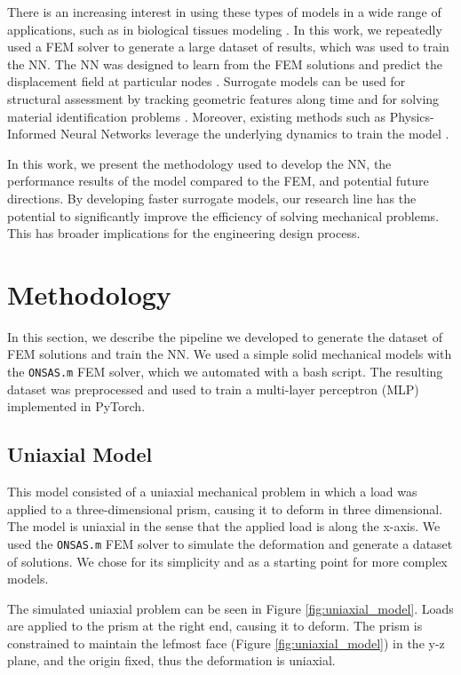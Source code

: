 \documentclass[oneside,a4paper,english,links]{amca}
\begin{document}
There is an increasing interest in using these types of models in a wide range of applications, such as in biological tissues modeling \citep{pellicer2020real}. In this work, we repeatedly used a FEM solver to generate a large dataset of results, which was used to train the NN. The NN was designed to learn from the FEM solutions and predict the displacement field at particular nodes \citep{yang2022tracker}. Surrogate models can be used for structural assessment by tracking geometric features along time \citep{zhu2023visual} and for solving material identification problems \citep{steuben2015inverse}. Moreover, existing methods such as Physics-Informed Neural Networks leverage the underlying dynamics to train the model \citep{raissi2017physics}.

In this work, we present the methodology used to develop the NN, the performance results of the model compared to the FEM, and potential future directions. By developing faster surrogate models, our research line has the potential to significantly improve the efficiency of solving mechanical problems. This has broader implications for the engineering design process.

\section{Methodology}
In this section, we describe the pipeline we developed to generate the dataset of FEM solutions and train the NN. We used a simple solid mechanical models with the \texttt{ONSAS.m} FEM solver, which we automated with a bash script. The resulting dataset was preprocessed and used to train a multi-layer perceptron (MLP) implemented in PyTorch.

\subsection{Uniaxial Model}
This model consisted of a uniaxial mechanical problem in which a load was applied to a three-dimensional prism, causing it to deform in three dimensional. The model is uniaxial in the sense that the applied load is along the x-axis. We used the \texttt{ONSAS.m} FEM solver to simulate the deformation and generate a dataset of solutions. We chose for its simplicity and as a starting point for more complex models.

The simulated uniaxial problem can be seen in Figure \ref{fig:uniaxial_model}. Loads are applied to the prism at the right end, causing it to deform. The prism is constrained to maintain the lefmost face (Figure \ref{fig:uniaxial_model}) in the y-z plane, and the origin fixed, thus the deformation is uniaxial.
\end{document}
